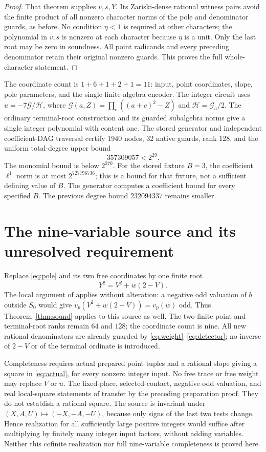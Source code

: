 \documentclass[11pt,a4paper]{article}
\begin{document}
\begin{proof}
That theorem supplies $v,s,Y$. Its Zariski-dense rational witness pairs
avoid the finite product of all nonzero character norms of the pole
and denominator guards, as before. No condition $\eta<1$ is required
at other characters; the polynomial in $v,s$ is nonzero at each character
because $\eta$ is a unit. Only the last root may be zero in soundness.
All point radicands and every preceding denominator retain their original
nonzero guards. This proves the full whole-character statement.
\end{proof}

The coordinate count is
$1+6+1+2+1=11$: input, point coordinates, slope, pole parameters,
and the single finite-algebra encoder. The integer circuit uses
$u=-7\mathcal G/\mathcal H$, where
$\mathcal G(a,Z)=\prod_c((a+c)^2-Z)$ and
$\mathcal H=\mathcal G_a/2$. The ordinary terminal-root construction
and its guarded subalgebra norms \cite{Terminal} give a single integer
polynomial with content one. The stored generator and independent
coefficient-DAG traversal certify 1940 nodes, 32 native guards, rank 128,
and the uniform total-degree upper bound
\[
                         357309057<2^{29}.
\]
The monomial bound is below $2^{270}$. For the stored fixture $B=3$,
the coefficient $\ell^1$ norm is at most $2^{727796736}$; this is a
bound for that fixture, not a sufficient defining value of $B$.
The generator computes a coefficient bound for every specified $B$.
The previous degree bound $232094337$ remains smaller.

\section{The nine-variable source and its unresolved requirement}
Replace \eqref{eq:pole} and its two free coordinates by one finite root
\begin{equation}\label{eq:actual}
                          Y^2=V^2+w(2-V).
\end{equation}
The local argument of \cite{Criterion} applies without alteration:
a negative odd valuation of $b$ outside $S_0$ would give
$v_p(V^2+w(2-V))=v_p(w)$ odd. Thus Theorem~\ref{thm:sound}
applies to this source as well. The two finite point and terminal-root
ranks remain $64$ and $128$; the coordinate count is nine.
All new rational denominators are already guarded by
\eqref{eq:weight}--\eqref{eq:detector}; no inverse of $2-V$ or of the
terminal ordinate is introduced.

Completeness requires actual prepared point tuples and a rational
slope giving a square in \eqref{eq:actual}, for every nonzero integer
input. No free trace or free weight may replace $V$ or $u$.
The fixed-place, selected-contact, negative odd valuation, and real
local-square statements of \cite{Criterion} transfer by the preceding
preparation proof. They do not establish a rational square.
The source is invariant under $(X,A,U)\mapsto(-X,-A,-U)$, because
only signs of the last two tests change. Hence realization for all
sufficiently large positive integers would suffice after multiplying
by finitely many integer input factors, without adding variables.
Neither this cofinite realization nor full nine-variable completeness
is proved here.
\end{document}
